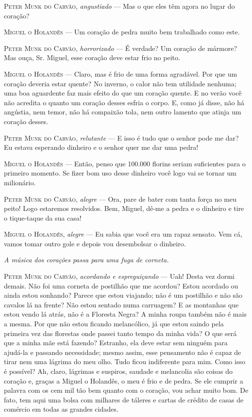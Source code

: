 \textsc{Peter Munk do Carvão}, \emph{angustiado} --- Mas o que eles têm agora no
lugar do coração?

\textsc{Miguel o Holandês} --- Um coração de pedra muito bem trabalhado como este.

\textsc{Peter Munk do Carvão}, \emph{horrorizado} --- É verdade? Um coração de
mármore? Mas ouça, Sr. Miguel, esse coração deve estar frio no peito.

\textsc{Miguel o Holandês} --- Claro, mas é frio de uma forma agradável. Por que
um coração deveria estar quente? No inverno, o calor não tem utilidade
nenhuma; uma boa aguardente faz mais efeito do que um coração quente. E
no verão você não acredita o quanto um coração desses esfria o corpo. E,
como já disse, não há angústia, nem temor, não há compaixão tola, nem
outro lamento que atinja um coração desses.

\textsc{Peter Munk do Carvão}, \emph{relutante} --- E isso é tudo que o senhor
pode me dar? Eu estava esperando dinheiro e o senhor quer me dar uma
pedra!

\textsc{Miguel o Holandês} --- Então, penso que 100.000 florins seriam suficientes
para o primeiro momento. Se fizer bom uso desse dinheiro você logo vai
se tornar um milionário.

\textsc{Peter Munk do Carvão}, \emph{alegre} --- Ora, pare de bater com tanta
força no meu peito! Logo estaremos resolvidos. Bem, Miguel, dê-me a
pedra e o dinheiro e tire o tique-taque da sua casa!

\textsc{Miguel o Holandês}, \emph{alegre} --- Eu sabia que você era um rapaz
sensato. Vem cá, vamos tomar outro gole e depois vou desembolsar o
dinheiro.

\emph{A música dos corações passa para uma fuga de corneta.}

\textsc{Peter Munk do Carvão}, \emph{acordando e espreguiçando} --- Uah! Desta vez
dormi demais. Não foi uma corneta de postilhão que me acordou? Estou
acordado ou ainda estou sonhando? Parece que estou viajando; não é um
postilhão e não são cavalos lá na frente? Não estou sentado numa
carruagem? E as montanhas que estou vendo lá atrás, não é a Floresta
Negra? A minha roupa também não é mais a mesma. Por que não estou
ficando melancólico, já que estou saindo pela primeira vez das florestas
onde passei tanto tempo da minha vida? O que será que a minha mãe está
fazendo? Estranho, ela deve estar sem ninguém para ajudá-la e passando
necessidade; mesmo assim, esse pensamento não é capaz de tirar nem uma
lágrima do meu olho. Tudo ficou indiferente para mim. Como isso é
possível? Ah, claro, lágrimas e suspiros, saudade e melancolia são
coisas do coração e, graças a Miguel o Holandês, o meu é frio e de
pedra. Se ele cumprir a palavra com os cem mil tão bem quanto com o
coração, vou achar muito bom. De fato, tem aqui uma bolsa com milhares
de táleres e cartas de crédito de casas de comércio em todas as grandes
cidades.

